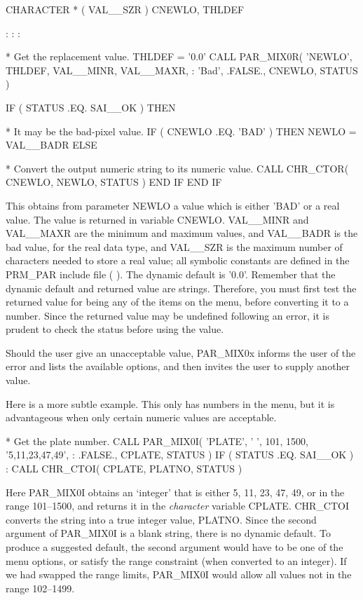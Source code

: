 \documentclass[twoside,11pt,nolof]{starlink}
\providecommand{\dash}{--}
\begin{document}
\begin{terminalv}
      CHARACTER * ( VAL__SZR ) CNEWLO, THLDEF

          :       :       :

*  Get the replacement value.
      THLDEF = '0.0'
      CALL PAR_MIX0R( 'NEWLO', THLDEF, VAL__MINR, VAL__MAXR,
     :                'Bad', .FALSE., CNEWLO, STATUS )

      IF ( STATUS .EQ. SAI__OK ) THEN

*  It may be the bad-pixel value.
         IF ( CNEWLO .EQ. 'BAD' ) THEN
            NEWLO = VAL__BADR
         ELSE

*  Convert the output numeric string to its numeric value.
            CALL CHR_CTOR( CNEWLO, NEWLO, STATUS )
         END IF
      END IF
\end{terminalv}

This obtains from parameter NEWLO a value which is either 'BAD' or a
real value.  The value is returned in variable CNEWLO.  VAL\_\_MINR and
VAL\_\_MAXR are the minimum and maximum values, and VAL\_\_BADR is the
bad value, for the real data type, and VAL\_\_SZR is the maximum number
of characters needed to store a real value; all symbolic constants are
defined in the PRM\_PAR include file (
).
 The dynamic default is
'0.0'. Remember that the dynamic default and returned value are
strings.  Therefore, you must first test the returned value for being any
of the items on the menu, before converting it to a number.  Since the
returned value may be undefined following an error, it is prudent to
check the status before using the value.

Should the user give an unacceptable value, PAR\_MIX0x informs the user
of the error and lists the available options, and then invites the user
to supply another value.

Here is a more subtle example.  This only has numbers in the menu, but
it is advantageous when only certain numeric values are acceptable.
\begin{terminalv}
*  Get the plate number.
      CALL PAR_MIX0I( 'PLATE', ' ', 101, 1500, '5,11,23,47,49',
     :                .FALSE., CPLATE, STATUS )
      IF ( STATUS .EQ. SAI__OK )
     :  CALL CHR_CTOI( CPLATE, PLATNO, STATUS )
\end{terminalv}

Here PAR\_MIX0I obtains an `integer' that is either 5, 11, 23, 47, 49,
or in the range 101\dash1500, and returns it in the \emph{character\/}
variable CPLATE.  CHR\_CTOI converts the string into a true integer
value, PLATNO.  Since the second argument of PAR\_MIX0I is a blank
string, there is no dynamic default.  To produce a suggested default,
the second argument would have to be one of the menu options, or satisfy
the range constraint (when converted to an integer). If we had swapped
the range limits, PAR\_MIX0I would allow all values not in the range
102\dash1499.
\end{document}
